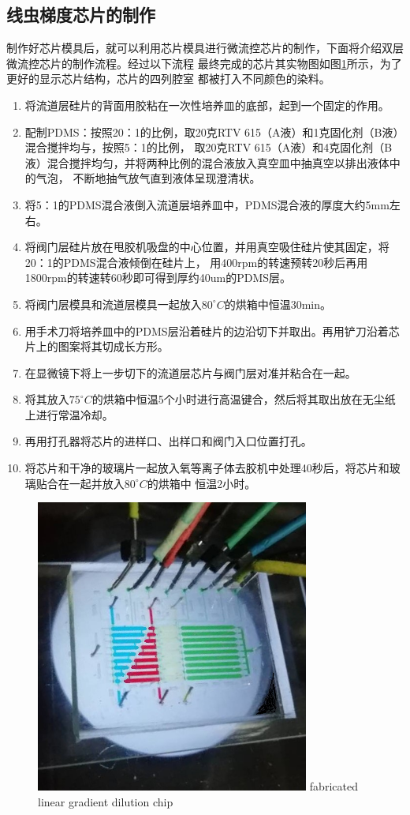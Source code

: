 \subsection{线虫梯度芯片的制作}
	制作好芯片模具后，就可以利用芯片模具进行微流控芯片的制作，下面将介绍双层微流控芯片的制作流程。经过以下流程
	最终完成的芯片其实物图如图\ref{fig:chap2:chip-fabric}所示，为了更好的显示芯片结构，芯片的四列腔室
	都被打入不同颜色的染料。
	\begin{enumerate}[label={\alph*)},font={\color{black!50!black}\bfseries}]
	\item 将流道层硅片的背面用胶粘在一次性培养皿的底部，起到一个固定的作用。
	\item 配制PDMS：按照20：1的比例，取20克RTV 615（A液）和1克固化剂（B液）混合搅拌均与，按照5：1的比例，
	取20克RTV 615（A液）和4克固化剂（B液）混合搅拌均匀，并将两种比例的混合液放入真空皿中抽真空以排出液体中的气泡，
	不断地抽气放气直到液体呈现澄清状。
	\item 将5：1的PDMS混合液倒入流道层培养皿中，PDMS混合液的厚度大约5mm左右。
	\item 将阀门层硅片放在甩胶机吸盘的中心位置，并用真空吸住硅片使其固定，将20：1的PDMS混合液倾倒在硅片上，
	用400rpm的转速预转20秒后再用1800rpm的转速转60秒即可得到厚约40um的PDMS层。
	\item 将阀门层模具和流道层模具一起放入$80^\circ C$的烘箱中恒温30min。
	\item 用手术刀将培养皿中的PDMS层沿着硅片的边沿切下并取出。再用铲刀沿着芯片上的图案将其切成长方形。
	\item 在显微镜下将上一步切下的流道层芯片与阀门层对准并粘合在一起。
	\item 将其放入$75^\circ C$的烘箱中恒温5个小时进行高温键合，然后将其取出放在无尘纸上进行常温冷却。
	\item 再用打孔器将芯片的进样口、出样口和阀门入口位置打孔。
	\item 将芯片和干净的玻璃片一起放入氧等离子体去胶机中处理40秒后，将芯片和玻璃贴合在一起并放入$80^\circ C$的烘箱中
	恒温2小时。
	\end{enumerate}
	\begin{figure}[htbp]
	  \centering
	  \includegraphics[width=9cm]{figure/chap2/fabric-chip.jpg}
		{fabricated linear gradient dilution chip}
	  \label{fig:chap2:chip-fabric}
	\end{figure}
